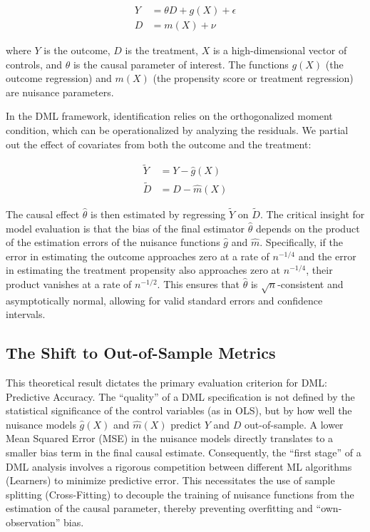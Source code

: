\documentclass[12pt,a4paper]{article}
\begin{document}
\begin{align}
Y &= \theta D + g(X) + \epsilon \\
D &= m(X) + \nu
\end{align}

where $Y$ is the outcome, $D$ is the treatment, $X$ is a high-dimensional vector of controls, and $\theta$ is the causal parameter of interest. The functions $g(X)$ (the outcome regression) and $m(X)$ (the propensity score or treatment regression) are nuisance parameters.

In the DML framework, identification relies on the orthogonalized moment condition, which can be operationalized by analyzing the residuals. We partial out the effect of covariates from both the outcome and the treatment:

\begin{align}
\tilde{Y} &= Y - \hat{g}(X) \\
\tilde{D} &= D - \hat{m}(X)
\end{align}

The causal effect $\hat{\theta}$ is then estimated by regressing $\tilde{Y}$ on $\tilde{D}$. The critical insight for model evaluation is that the bias of the final estimator $\hat{\theta}$ depends on the product of the estimation errors of the nuisance functions $\hat{g}$ and $\hat{m}$. Specifically, if the error in estimating the outcome approaches zero at a rate of $n^{-1/4}$ and the error in estimating the treatment propensity also approaches zero at $n^{-1/4}$, their product vanishes at a rate of $n^{-1/2}$. This ensures that $\hat{\theta}$ is $\sqrt{n}$-consistent and asymptotically normal, allowing for valid standard errors and confidence intervals.

\subsection{The Shift to Out-of-Sample Metrics}

This theoretical result dictates the primary evaluation criterion for DML: Predictive Accuracy. The ``quality'' of a DML specification is not defined by the statistical significance of the control variables (as in OLS), but by how well the nuisance models $\hat{g}(X)$ and $\hat{m}(X)$ predict $Y$ and $D$ out-of-sample. A lower Mean Squared Error (MSE) in the nuisance models directly translates to a smaller bias term in the final causal estimate. Consequently, the ``first stage'' of a DML analysis involves a rigorous competition between different ML algorithms (Learners) to minimize predictive error. This necessitates the use of sample splitting (Cross-Fitting) to decouple the training of nuisance functions from the estimation of the causal parameter, thereby preventing overfitting and ``own-observation'' bias.
\end{document}
